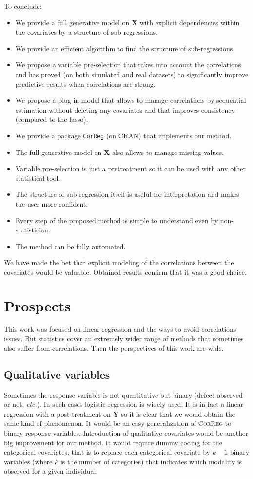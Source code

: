 \documentclass[12pt,a4paper]{report}
\begin{document}
		To conclude:
		\begin{itemize}
			\item We provide a full generative model on $\boldsymbol{X}$ with explicit dependencies within the covariates by a structure of sub-regressions.
			\item We provide an efficient algorithm to find the structure of sub-regressions.
			\item We propose a variable pre-selection that takes into account the correlations and has proved (on both simulated and real datasets) to significantly improve predictive results when correlations are strong.
			\item We propose a plug-in model that allows to manage correlations by sequential estimation without deleting any covariates and that improves consistency (compared to the {\sc lasso}).
			\item We provide a package {\tt CorReg} (on CRAN) that implements our method.
			\item The full generative model on $\boldsymbol{X}$ also allows to manage missing values.
			\item Variable pre-selection is just a pretreatment so it can be used with any other statistical tool.
			\item The structure of sub-regression itself is useful for interpretation and makes the user more confident.
			\item Every step of the proposed method is simple to understand even by non-statistician.
			\item The method can be fully automated.
		\end{itemize}
		We have made the bet that explicit modeling of the correlations between the covariates would be valuable. Obtained results confirm that it was a good choice.		
		
	\section{Prospects}
	This work was focused on linear regression and the ways to avoid correlations issues. But statistics cover an extremely wider range of methods that sometimes also suffer from correlations. Then the perspectives of this work are wide.
		\subsection{Qualitative variables}
			Sometimes the response variable is not quantitative but binary (defect observed or not, {\it etc.}). In such cases logistic regression is widely used.
			It is \cite{hosmer2000applied} in fact a linear regression with a post-treatment on $\boldsymbol{Y}$ so it is clear that we would obtain the same kind of phenomenon. It would be an easy generalization of \textsc{CorReg} to binary response variables. Introduction of qualitative covariates would be another big improvement for our method. It would require dummy coding for the categorical covariates, that is to replace each categorical covariate by $k-1$ binary variables (where $k$ is the number of categories) that indicates which modality is observed for a given individual.
			
\end{document}
